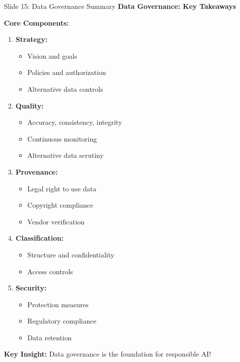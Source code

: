 \documentclass[8pt]{beamer}
\begin{document}
	\begin{frame}{Slide 15: Data Governance Summary}
		\fontsize{6.5}{7.5}\selectfont
		\textbf{Data Governance: Key Takeaways}
		
		\vspace{0.1cm}
		\textbf{Core Components:}
		\begin{enumerate}
			\item \textbf{Strategy:}
			\begin{itemize}
				\item Vision and goals
				\item Policies and authorization
				\item Alternative data controls
			\end{itemize}
			\item \textbf{Quality:}
			\begin{itemize}
				\item Accuracy, consistency, integrity
				\item Continuous monitoring
				\item Alternative data scrutiny
			\end{itemize}
			\item \textbf{Provenance:}
			\begin{itemize}
				\item Legal right to use data
				\item Copyright compliance
				\item Vendor verification
			\end{itemize}
			\item \textbf{Classification:}
			\begin{itemize}
				\item Structure and confidentiality
				\item Access controls
			\end{itemize}
			\item \textbf{Security:}
			\begin{itemize}
				\item Protection measures
				\item Regulatory compliance
				\item Data retention
			\end{itemize}
		\end{enumerate}
		
		\textcolor{myblue}{\textbf{Key Insight:}} Data governance is the \textcolor{myblue}{foundation for responsible AI}!
	\end{frame}
	
\end{document}
